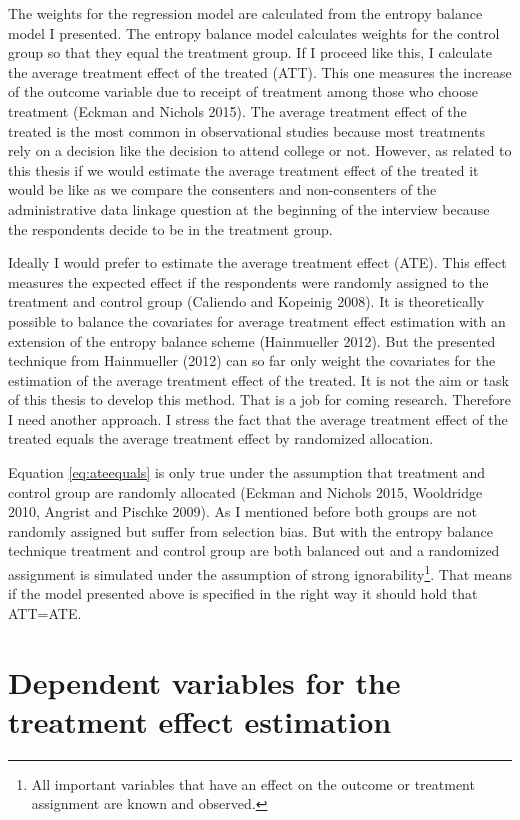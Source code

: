 The weights for the regression model are calculated from the entropy balance model I presented. The entropy balance model calculates weights for the control group so that they equal the treatment group. If I proceed like this, I calculate the average treatment effect of the treated (ATT). This one measures the increase of the outcome variable due to receipt of treatment among those who choose treatment (Eckman and Nichols 2015). The average treatment effect of the treated is the most common in observational studies because most treatments rely on a decision like the decision to attend college or not. However, as related to this thesis if we would estimate the average treatment effect of the treated it would be like as we compare the consenters and non-consenters of the administrative data linkage question at the beginning of the interview because the respondents decide to be in the treatment group.

Ideally I would prefer to estimate the average treatment effect (ATE). This effect measures the expected effect if the respondents were randomly assigned to the treatment and control group (Caliendo and Kopeinig 2008). It is theoretically possible to balance the covariates for average treatment effect estimation with an extension of the entropy balance scheme (Hainmueller 2012). But the presented technique from Hainmueller (2012) can so far only weight the covariates for the estimation of the average treatment effect of the treated. It is not the aim or task of this thesis to develop this method. That is a job for coming research. Therefore I need another approach. I stress the fact that the average treatment effect of the treated equals the average treatment effect by randomized allocation. 

Equation \ref{eq:ateequals} is only true under the assumption that treatment and control group are randomly allocated (Eckman and Nichols 2015, Wooldridge 2010, Angrist and Pischke 2009). As I mentioned before both groups are not randomly assigned but suffer from selection bias. But with the entropy balance technique treatment and control group are both balanced out and a randomized assignment is simulated under the assumption of strong ignorability\footnote{All important variables that have an effect on the outcome or treatment assignment are known and observed.}. That means if the model presented above is specified in the right way it should hold that ATT=ATE. 





\section{Dependent variables for the treatment effect estimation}\label{variables} 

